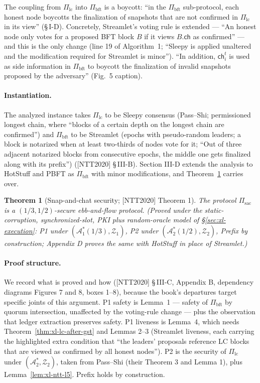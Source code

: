 \documentclass[11pt,a4paper]{article}
\newtheorem{theorem}{Theorem}[section]
\theoremstyle{definition}
\begin{document}
The coupling from $\Pi_{\mathrm{lc}}$ into $\Pi_{\mathrm{bft}}$ is a
boycott: ``in the $\Pi_{\mathrm{bft}}$ sub-protocol, each honest node
boycotts the finalization of snapshots that are not confirmed in
$\Pi_{\mathrm{lc}}$ in its view'' (\S\,I-D). Concretely, Streamlet's
voting rule is extended --- ``An honest node only votes for a proposed BFT
block $B$ if it views $B.\mathsf{ch}$ as confirmed'' --- and this is the
only change (line 19 of Algorithm~1; ``Sleepy is applied unaltered and the
modification required for Streamlet is minor''). ``In addition,
$\mathsf{ch}_i^t$ is used as side information in $\Pi_{\mathrm{bft}}$ to
boycott the finalization of invalid snapshots proposed by the adversary''
(Fig.~5 caption).

\paragraph{Instantiation.} The analyzed instance takes
$\Pi_{\mathrm{lc}}$ to be Sleepy consensus (Pass--Shi; permissioned
longest chain, where ``blocks of a certain depth on the longest chain are
confirmed'') and $\Pi_{\mathrm{bft}}$ to be Streamlet (epochs with
pseudo-random leaders; a block is notarized when at least two-thirds of
nodes vote for it; ``Out of three adjacent notarized blocks from
consecutive epochs, the middle one gets finalized along with its
prefix'') ([NTT2020] \S\,III-B). Section III-D extends the analysis to
HotStuff and PBFT as $\Pi_{\mathrm{bft}}$ with minor modifications, and
Theorem~\ref{thm:xl-sac-security} carries over.

\begin{theorem}[Snap-and-chat security; {[NTT2020]} Theorem 1]
\label{thm:xl-sac-security}
The protocol $\Pi_{\mathrm{sac}}$ is a $(1/3, 1/2)$-secure ebb-and-flow
protocol. (Proved under the static-corruption, synchronized-slot, PKI plus
random-oracle model of \S\ref{sec:xl-execution}: P1 under
$(\mathcal{A}_1^*(1/3), \mathcal{Z}_1)$, P2 under
$(\mathcal{A}_2^*(1/2), \mathcal{Z}_2)$, Prefix by construction; Appendix
D proves the same with HotStuff in place of Streamlet.)
\end{theorem}

\paragraph{Proof structure.} We record what is proved and how ([NTT2020]
\S\,III-C, Appendix B, dependency diagrams Figures 7 and 8, boxes 1--8),
because the book's departures target specific joints of this argument.
P1 safety is Lemma~1 --- safety of $\Pi_{\mathrm{bft}}$ by quorum
intersection, unaffected by the voting-rule change --- plus the
observation that ledger extraction preserves safety. P1 liveness is
Lemma~4, which needs Theorem~\ref{thm:xl-lc-after-gst} and Lemmas 2--3
(Streamlet liveness, each carrying the highlighted extra condition that
``the leaders' proposals reference LC blocks that are viewed as confirmed
by all honest nodes''). P2 is the security of $\Pi_{\mathrm{lc}}$ under
$(\mathcal{A}_2^*, \mathcal{Z}_2)$, taken from Pass--Shi (their Theorem 3
and Lemma 1), plus Lemma~\ref{lem:xl-ntt-l5}. Prefix holds by
construction.
\end{document}
